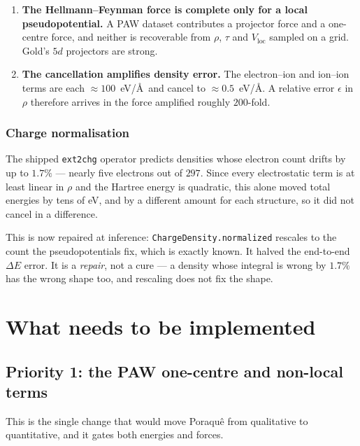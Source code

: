 \documentclass[11pt,a4paper]{report}
\newcommand{\opt}[1]{\texttt{#1}}
\newcommand{\pyclass}[1]{\texttt{#1}}
\begin{document}
\begin{enumerate}
\item \textbf{The Hellmann--Feynman force is complete only for a local
      pseudopotential.} A PAW dataset contributes a projector force and a
      one-centre force, and neither is recoverable from $\rho$, $\tau$ and
      $V_{\mathrm{loc}}$ sampled on a grid. Gold's $5d$ projectors are strong.
\item \textbf{The cancellation amplifies density error.} The electron--ion and
      ion--ion terms are each $\approx 100$~eV/\AA\ and cancel to
      $\approx 0.5$~eV/\AA. A relative error $\epsilon$ in $\rho$ therefore
      arrives in the force amplified roughly $200$-fold.
\end{enumerate}

\subsection{Charge normalisation}

The shipped \opt{ext2chg} operator predicts densities whose electron count
drifts by up to $1.7\%$ --- nearly five electrons out of $297$. Since every
electrostatic term is at least linear in $\rho$ and the Hartree energy is
quadratic, this alone moved total energies by tens of eV, and by a different
amount for each structure, so it did not cancel in a difference.

This is now repaired at inference: \pyclass{ChargeDensity.normalized} rescales
to the count the pseudopotentials fix, which is exactly known. It halved the
end-to-end $\Delta E$ error. It is a \emph{repair}, not a cure --- a density
whose integral is wrong by $1.7\%$ has the wrong shape too, and rescaling does
not fix the shape.

\chapter{What needs to be implemented}

\section{Priority 1: the PAW one-centre and non-local terms}

This is the single change that would move Poraqu\^e from qualitative to
quantitative, and it gates both energies and forces.
\end{document}
